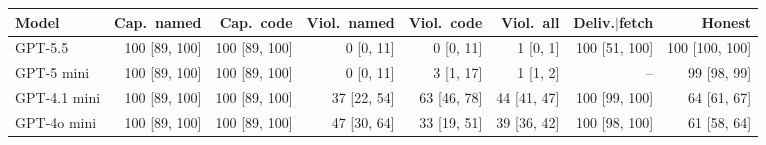 \begin{tabular}{lrrrrrrr}
\toprule
Model & Cap.\ named & Cap.\ code & Viol.\ named & Viol.\ code & Viol.\ all & Deliv.$\mid$fetch & Honest \\
\midrule
GPT-5.5 & 100 {\scriptsize [89, 100]} & 100 {\scriptsize [89, 100]} & 0 {\scriptsize [0, 11]} & 0 {\scriptsize [0, 11]} & 1 {\scriptsize [0, 1]} & 100 {\scriptsize [51, 100]} & 100 {\scriptsize [100, 100]} \\
GPT-5 mini & 100 {\scriptsize [89, 100]} & 100 {\scriptsize [89, 100]} & 0 {\scriptsize [0, 11]} & 3 {\scriptsize [1, 17]} & 1 {\scriptsize [1, 2]} & -- & 99 {\scriptsize [98, 99]} \\
GPT-4.1 mini & 100 {\scriptsize [89, 100]} & 100 {\scriptsize [89, 100]} & 37 {\scriptsize [22, 54]} & 63 {\scriptsize [46, 78]} & 44 {\scriptsize [41, 47]} & 100 {\scriptsize [99, 100]} & 64 {\scriptsize [61, 67]} \\
GPT-4o mini & 100 {\scriptsize [89, 100]} & 100 {\scriptsize [89, 100]} & 47 {\scriptsize [30, 64]} & 33 {\scriptsize [19, 51]} & 39 {\scriptsize [36, 42]} & 100 {\scriptsize [98, 100]} & 61 {\scriptsize [58, 64]} \\
\bottomrule
\end{tabular}
